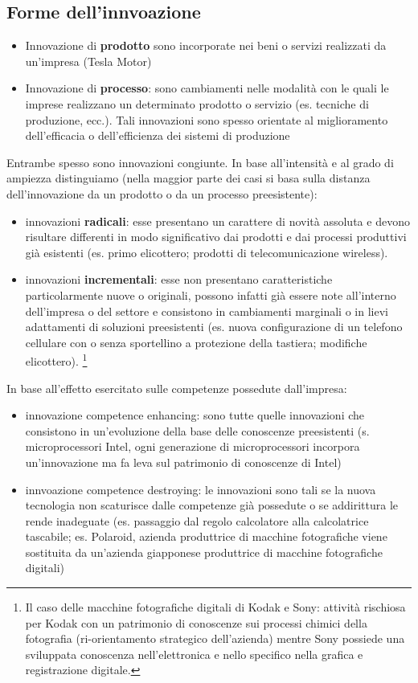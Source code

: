 \documentclass{article}
\begin{document}
\subsection{Forme dell'innvoazione}
\begin{itemize}
	\item Innovazione di \textbf{prodotto} sono incorporate nei beni o servizi realizzati da un’impresa (Tesla Motor)
	\item Innovazione di \textbf{processo}: sono cambiamenti nelle modalità con le quali le imprese
	realizzano un determinato prodotto o servizio (es. tecniche di produzione, ecc.). Tali
	innovazioni sono spesso orientate al miglioramento dell’efficacia o dell’efficienza dei
	sistemi di produzione
\end{itemize}
Entrambe spesso sono innovazioni congiunte.
In base all’intensità e al grado di ampiezza distinguiamo (nella maggior parte dei casi si basa sulla
distanza dell’innovazione da un prodotto o da un processo preesistente):
\begin{itemize}
	\item innovazioni \textbf{radicali}: esse presentano un carattere di novità assoluta e devono
	risultare differenti in modo significativo dai prodotti e dai processi produttivi già esistenti
	(es. primo elicottero; prodotti di telecomunicazione wireless).
	\item innovazioni \textbf{incrementali}: esse non presentano caratteristiche particolarmente nuove
	o originali, possono infatti già essere note all’interno dell’impresa o del settore e consistono in cambiamenti marginali o in lievi adattamenti di soluzioni preesistenti (es.	nuova configurazione di un telefono cellulare con o senza sportellino a protezione della tastiera; modifiche elicottero).
	\footnote{Il caso delle macchine fotografiche digitali di Kodak e Sony: attività rischiosa per Kodak con un patrimonio di conoscenze sui processi chimici della fotografia (ri-orientamento strategico dell’azienda) mentre Sony possiede una sviluppata conoscenza nell’elettronica  e nello specifico nella grafica e registrazione digitale.}
\end{itemize}

In base all’effetto esercitato sulle competenze possedute dall’impresa:
\begin{itemize}
	\item innovazione competence enhancing: sono tutte quelle innovazioni che consistono in un'evoluzione della base delle conoscenze preesistenti (s. microprocessori Intel, ogni
	generazione di microprocessori incorpora un’innovazione ma fa leva sul patrimonio di
	conoscenze di Intel)
	\item innvoazione competence destroying: le innovazioni sono tali se la nuova tecnologia
	non scaturisce dalle competenze già possedute o se addirittura le rende inadeguate (es.
	passaggio dal regolo calcolatore alla calcolatrice tascabile; es. Polaroid, azienda produttrice
	di macchine fotografiche viene sostituita da un’azienda giapponese produttrice di
	macchine fotografiche digitali)
\end{itemize}
\end{document}

